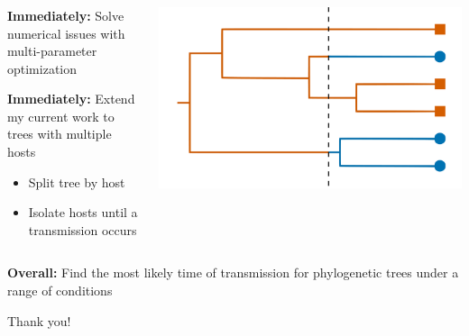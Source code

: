 \documentclass[aspectratio=169]{beamer}
\begin{document}
\begin{frame} \frametitle{\insertsection}
    
    \begin{columns}

        \begin{column}{0.5\textwidth}

            \textbf{Immediately:} Solve numerical issues with multi-parameter optimization 

            \textbf{Immediately:} Extend my current work to trees with multiple hosts

            \begin{itemize}
                \item{Split tree by host}
                \item{Isolate hosts until a transmission occurs}
            \end{itemize}
            
        \end{column}

        \begin{column}{0.5\textwidth}

            \centering\includegraphics[width=\textwidth]{images/tree-option1}

        \end{column}

    \end{columns}
    
    \vfill

    \textbf{Overall:} Find the most likely time of transmission for phylogenetic
    trees under a range of conditions 

\end{frame}

\begin{frame}

    \begin{center}

        \begin{Huge}

            Thank you!

        \end{Huge}


    \end{center}

\end{frame}
\end{document}
